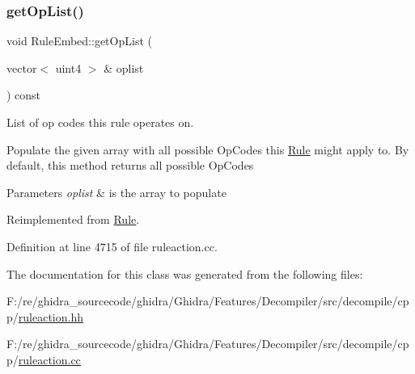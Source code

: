 \subsubsection{\texorpdfstring{getOpList()}{getOpList()}}
{\footnotesize\ttfamily void Rule\+Embed\+::get\+Op\+List (\begin{DoxyParamCaption}\item[{vector$<$ uint4 $>$ \&}]{oplist }\end{DoxyParamCaption}) const\hspace{0.3cm}{\ttfamily [virtual]}}



List of op codes this rule operates on. 

Populate the given array with all possible Op\+Codes this \mbox{\hyperlink{class_rule}{Rule}} might apply to. By default, this method returns all possible Op\+Codes 
\begin{DoxyParams}{Parameters}
{\em oplist} & is the array to populate \\
\hline
\end{DoxyParams}


Reimplemented from \mbox{\hyperlink{class_rule_a4023bfc7825de0ab866790551856d10e}{Rule}}.



Definition at line 4715 of file ruleaction.\+cc.



The documentation for this class was generated from the following files\+:\begin{DoxyCompactItemize}
\item 
F\+:/re/ghidra\+\_\+sourcecode/ghidra/\+Ghidra/\+Features/\+Decompiler/src/decompile/cpp/\mbox{\hyperlink{ruleaction_8hh}{ruleaction.\+hh}}\item 
F\+:/re/ghidra\+\_\+sourcecode/ghidra/\+Ghidra/\+Features/\+Decompiler/src/decompile/cpp/\mbox{\hyperlink{ruleaction_8cc}{ruleaction.\+cc}}\end{DoxyCompactItemize}
